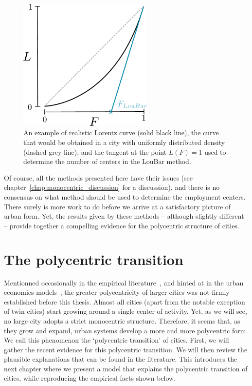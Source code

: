 \begin{figure}
    \centering
    \includegraphics[width=0.6\textwidth]{gfx/chapter-monocentric/loubar.pdf}
    \caption{An example of realistic Lorentz curve (solid black line), the curve
    that would be obtained in a city with uniformly distributed density (dashed
grey line), and the tangent at the point $L(F) = 1$ used to determine the number
of centers in the LouBar method.\label{fig:loubar}}
\end{figure}

Of course, all the methods presented here have their issues (see
chapter~\ref{chap:monocentric_discussion} for a discussion), and there is no
consensus on what method should be used to determine the employment centers.
There surely is more work to do before we arrive at a satisfactory picture of
urban form. Yet, the results given by these methods -- although slightly
different -- provide together a compelling evidence for the polycentric
structure of cities. 


\section{The polycentric transition}
\label{sec:the_polycentric_transition}

Mentionned occasionally in the empirical literature~\cite{McMillen:2007,
Readfearn:2007}, and hinted at in the urban economics models~\cite{Fujita:1982},
the greater polycentricity of larger cities was not firmly established before
this thesis. Almost all cities (apart from the notable exception of twin cities)
start growing around a single center of activity. Yet, as we will see, no large
city adopts a strict monocentric structure. Therefore, it seems that, as
they grow and expand, urban systems develop a more and more polycentric form. We
call this phenomenon the `polycentric transition' of cities. First, we will
gather the recent evidence for this polycentric transition. We will then review
the plausible explanations that can be found in the literature. This introduces
the next chapter where we present a model that explains the polycentric
transition of cities, while reproducing the empirical facts shown below. 

